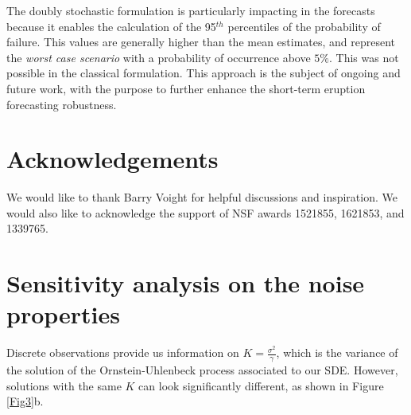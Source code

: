\documentclass{article}
\begin{document}
The doubly stochastic formulation is particularly impacting in the forecasts because it enables the calculation of the 95$^{th}$ percentiles of the probability of failure. This values are generally higher than the mean estimates, and represent the \emph{worst case scenario} with a probability of occurrence above $5\%$. This was not possible in the classical formulation. This approach is the subject of ongoing and future work, with the purpose to further enhance the short-term eruption forecasting robustness.

\section*{Acknowledgements}
We would like to thank Barry Voight for helpful discussions and inspiration. We would also like to acknowledge the support of NSF awards 1521855, 1621853, and 1339765.

\appendix
\section{Sensitivity analysis on the noise properties}\label{A-2}
Discrete observations provide us information on $K=\frac{\sigma^2}{\gamma}$, which is the variance of the solution of the Ornstein-Uhlenbeck process associated to our SDE. However, solutions with the same $K$ can look significantly different, as shown in Figure \ref{Fig3}b.
\end{document}
